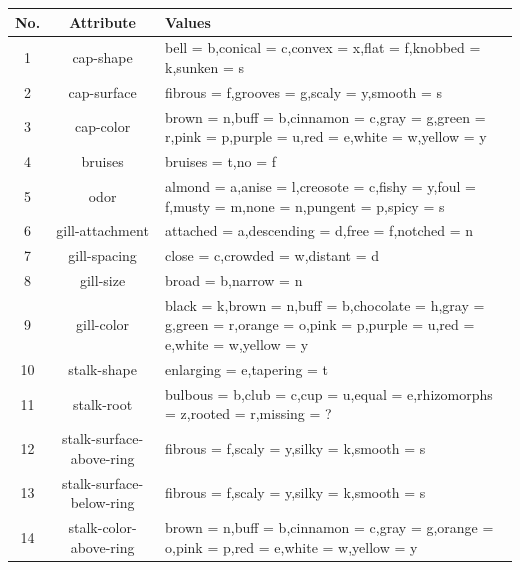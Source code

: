 \documentclass[a4paper,11pt]{article}
\begin{document}
            \begin{table}[h!]
            \begin{center}
            \begin{tabular} {|| c | c | p{8cm} ||}
                \hline
                \textbf {No.} & \textbf {Attribute} & \textbf {Values} \\
                \hline \hline
                1 & cap-shape & bell = b,conical = c,convex = x,flat = f,knobbed = k,sunken = s \\
                \hline
                2 & cap-surface & fibrous = f,grooves = g,scaly = y,smooth = s \\
                \hline
                3 & cap-color & brown = n,buff = b,cinnamon = c,gray = g,green = r,pink = p,purple = u,red = e,white = w,yellow = y \\
                \hline
                4 & bruises & bruises = t,no = f \\
                \hline
                5 & odor & almond = a,anise = l,creosote = c,fishy = y,foul = f,musty = m,none = n,pungent = p,spicy = s \\
                \hline
                6 & gill-attachment & attached = a,descending = d,free = f,notched = n \\
                \hline
                7 & gill-spacing & close = c,crowded = w,distant = d \\
                \hline
                8 & gill-size & broad = b,narrow = n \\
                \hline
                9 & gill-color & black = k,brown = n,buff = b,chocolate = h,gray = g,green = r,orange = o,pink = p,purple = u,red = e,white = w,yellow = y \\
                \hline
                10 & stalk-shape & enlarging = e,tapering = t \\
                \hline
                11 & stalk-root & bulbous = b,club = c,cup = u,equal = e,rhizomorphs = z,rooted = r,missing = ? \\
                \hline
                12 & stalk-surface-above-ring & fibrous = f,scaly = y,silky = k,smooth = s \\
                \hline
                13 & stalk-surface-below-ring & fibrous = f,scaly = y,silky = k,smooth = s \\
                \hline
                14 & stalk-color-above-ring & brown = n,buff = b,cinnamon = c,gray = g,orange = o,pink = p,red = e,white = w,yellow = y \\

\end{tabular}
\end{center}
\end{table}
\end{document}
